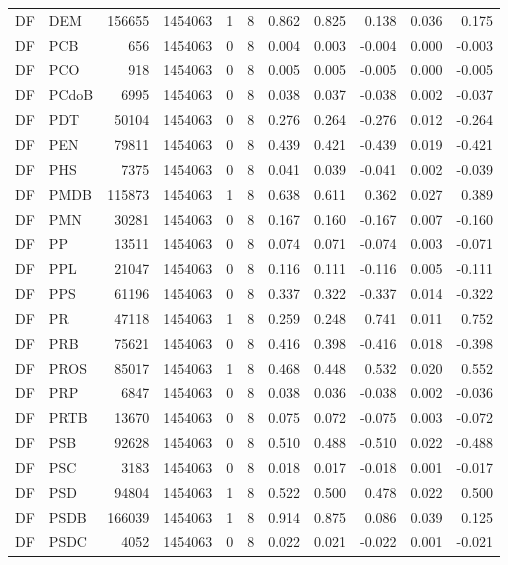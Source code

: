 \begin{landscape}
\begin{longtable}{llrrrrrrrrr}
DF & DEM & 156655 & 1454063 & 1 & 8 & 0.862 & 0.825 & 0.138 & 0.036 & 0.175 \\
DF & PCB & 656 & 1454063 & 0 & 8 & 0.004 & 0.003 & -0.004 & 0.000 & -0.003 \\
DF & PCO & 918 & 1454063 & 0 & 8 & 0.005 & 0.005 & -0.005 & 0.000 & -0.005 \\
DF & PCdoB & 6995 & 1454063 & 0 & 8 & 0.038 & 0.037 & -0.038 & 0.002 & -0.037 \\
DF & PDT & 50104 & 1454063 & 0 & 8 & 0.276 & 0.264 & -0.276 & 0.012 & -0.264 \\
DF & PEN & 79811 & 1454063 & 0 & 8 & 0.439 & 0.421 & -0.439 & 0.019 & -0.421 \\
DF & PHS & 7375 & 1454063 & 0 & 8 & 0.041 & 0.039 & -0.041 & 0.002 & -0.039 \\
DF & PMDB & 115873 & 1454063 & 1 & 8 & 0.638 & 0.611 & 0.362 & 0.027 & 0.389 \\
DF & PMN & 30281 & 1454063 & 0 & 8 & 0.167 & 0.160 & -0.167 & 0.007 & -0.160 \\
DF & PP & 13511 & 1454063 & 0 & 8 & 0.074 & 0.071 & -0.074 & 0.003 & -0.071 \\
DF & PPL & 21047 & 1454063 & 0 & 8 & 0.116 & 0.111 & -0.116 & 0.005 & -0.111 \\
DF & PPS & 61196 & 1454063 & 0 & 8 & 0.337 & 0.322 & -0.337 & 0.014 & -0.322 \\
DF & PR & 47118 & 1454063 & 1 & 8 & 0.259 & 0.248 & 0.741 & 0.011 & 0.752 \\
DF & PRB & 75621 & 1454063 & 0 & 8 & 0.416 & 0.398 & -0.416 & 0.018 & -0.398 \\
DF & PROS & 85017 & 1454063 & 1 & 8 & 0.468 & 0.448 & 0.532 & 0.020 & 0.552 \\
DF & PRP & 6847 & 1454063 & 0 & 8 & 0.038 & 0.036 & -0.038 & 0.002 & -0.036 \\
DF & PRTB & 13670 & 1454063 & 0 & 8 & 0.075 & 0.072 & -0.075 & 0.003 & -0.072 \\
DF & PSB & 92628 & 1454063 & 0 & 8 & 0.510 & 0.488 & -0.510 & 0.022 & -0.488 \\
DF & PSC & 3183 & 1454063 & 0 & 8 & 0.018 & 0.017 & -0.018 & 0.001 & -0.017 \\
DF & PSD & 94804 & 1454063 & 1 & 8 & 0.522 & 0.500 & 0.478 & 0.022 & 0.500 \\
DF & PSDB & 166039 & 1454063 & 1 & 8 & 0.914 & 0.875 & 0.086 & 0.039 & 0.125 \\
DF & PSDC & 4052 & 1454063 & 0 & 8 & 0.022 & 0.021 & -0.022 & 0.001 & -0.021 \\

\end{longtable}
\end{landscape}
